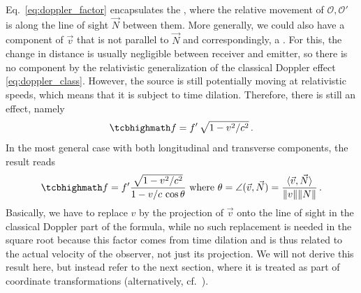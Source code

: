 \documentclass[../relativity_main.tex]{subfiles}
\begin{document}
Eq.~\eqref{eq:doppler_factor} encapsulates the , where the relative movement of $\mathcal{O}, \mathcal{O}'$ is along the line of sight $\vec{N}$ between them. More generally, we could also have a component of $\vec{v}$ that is not parallel to $\vec{N}$ and correspondingly, a . For this, the change in distance is usually negligible between receiver and emitter, so there is no component by the relativistic generalization of the classical Doppler effect \eqref{eq:doppler_class}. However, the source is still potentially moving at relativistic speeds, which means that it is subject to time dilation. Therefore, there is still an effect, namely
\begin{equation}
	\eqbox{f = f' \, \sqrt{1 - v^2 / c^2}} \, .
\end{equation}
In the most general case with both longitudinal and transverse components, the result reads
\begin{equation}\label{eq:general_doppler_v1}
	\eqbox{f = f' \frac{\sqrt{1 - v^2 / c^2}}{1 - v / c \, \cos \theta}} \text{ where } \theta = \angle(\vec{v}, \vec{N}) = \frac{\langle \vec{v}, \vec{N} \rangle}{\norm{v} \norm{N}} \, .
\end{equation}
Basically, we have to replace $v$ by the projection of $\vec{v}$ onto the line of sight in the classical Doppler part of the formula, while no such replacement is needed in the square root because this factor comes from time dilation and is thus related to the actual velocity of the observer, not just its projection. We will not derive this result here, but instead refer to the next section, where it is treated as part of coordinate transformations (alternatively, cf.~\cite{dragon_geometry_srt}).\\
\end{document}
